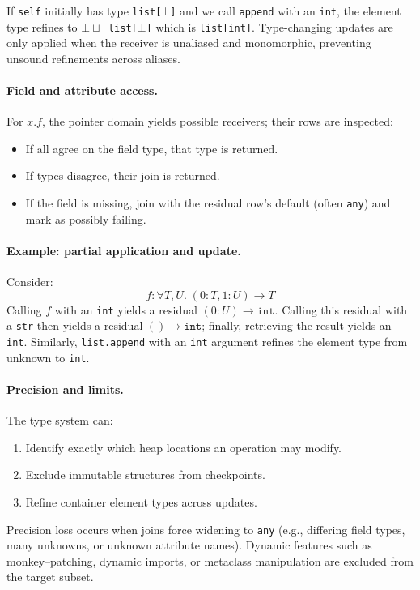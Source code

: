 If \texttt{self} initially has type \texttt{list[$\bot$]} and we call \texttt{append} with an \texttt{int}, the element type refines to \texttt{$\bot \sqcup$ list[$\bot$]} which is \texttt{list[int]}.  
Type-changing updates are only applied when the receiver is unaliased and monomorphic, preventing unsound refinements across aliases.

\paragraph{Field and attribute access.}
For $x.f$, the pointer domain yields possible receivers; their rows are inspected:
\begin{itemize}
  \item If all agree on the field type, that type is returned.
  \item If types disagree, their join is returned.
  \item If the field is missing, join with the residual row's default (often \texttt{any}) and mark as possibly failing.
\end{itemize}

\paragraph{Example: partial application and update.}
Consider:
\[
f : \forall T,U.\; (0:T, 1:U) \to T
\]
Calling $f$ with an \texttt{int} yields a residual $(0:U) \to \texttt{int}$.  
Calling this residual with a \texttt{str} then yields a residual  $() \to \texttt{int}$; finally, retrieving the result yields an \texttt{int}.  
Similarly, \texttt{list.append} with an \texttt{int} argument refines the element type from unknown to \texttt{int}.

\paragraph{Precision and limits.}
The type system can:
\begin{enumerate}
  \item Identify exactly which heap locations an operation may modify.
  \item Exclude immutable structures from checkpoints.
  \item Refine container element types across updates.
\end{enumerate}
Precision loss occurs when joins force widening to \texttt{any} (e.g., differing field types, many unknowns, or unknown attribute names).  
Dynamic features such as monkey--patching, dynamic imports, or metaclass manipulation are excluded from the target subset.

